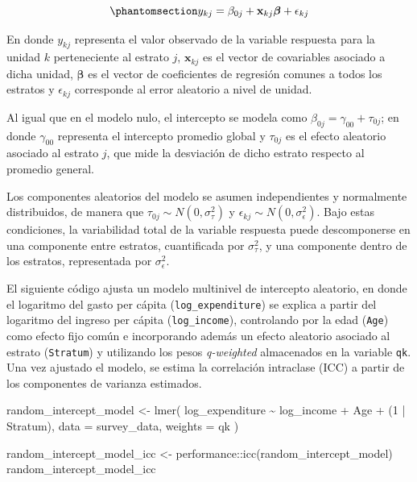 \documentclass[
  spanish,
  11pt,
  letterpaper,
  oneside,
  open=any]{scrbook}
\newenvironment{Shaded}{\begin{snugshade}}{\end{snugshade}}
\newcommand{\AttributeTok}[1]{\textcolor[rgb]{0.40,0.45,0.13}{#1}}
\newcommand{\DecValTok}[1]{\textcolor[rgb]{0.68,0.00,0.00}{#1}}
\newcommand{\FunctionTok}[1]{\textcolor[rgb]{0.28,0.35,0.67}{#1}}
\newcommand{\NormalTok}[1]{\textcolor[rgb]{0.00,0.23,0.31}{#1}}
\newcommand{\OtherTok}[1]{\textcolor[rgb]{0.00,0.23,0.31}{#1}}
\newcommand{\SpecialCharTok}[1]{\textcolor[rgb]{0.37,0.37,0.37}{#1}}
\begin{document}
\begin{equation}\protect\phantomsection\label{eq-modelo-intercepto-aleatorio}{
y_{kj} = \beta_{0j} + \mathbf{x}_{kj}\boldsymbol{\beta} + \epsilon_{kj}
}\end{equation}

En donde \(y_{kj}\) representa el valor observado de la variable
respuesta para la unidad \(k\) perteneciente al estrato \(j\),
\(\mathbf{x}_{kj}\) es el vector de covariables asociado a dicha unidad,
\(\boldsymbol{\beta}\) es el vector de coeficientes de regresión comunes
a todos los estratos y \(\epsilon_{kj}\) corresponde al error aleatorio
a nivel de unidad.

Al igual que en el modelo nulo, el intercepto se modela como
\(\beta_{0j} = \gamma_{00} + \tau_{0j}\); en donde \(\gamma_{00}\)
representa el intercepto promedio global y \(\tau_{0j}\) es el efecto
aleatorio asociado al estrato \(j\), que mide la desviación de dicho
estrato respecto al promedio general.

Los componentes aleatorios del modelo se asumen independientes y
normalmente distribuidos, de manera que
\(\tau_{0j} \sim N(0,\sigma_{\tau}^{2})\) y
\(\epsilon_{kj} \sim N(0,\sigma_{\epsilon}^{2})\). Bajo estas
condiciones, la variabilidad total de la variable respuesta puede
descomponerse en una componente entre estratos, cuantificada por
\(\sigma_{\tau}^{2}\), y una componente dentro de los estratos,
representada por \(\sigma_{\epsilon}^{2}\).

El siguiente código ajusta un modelo multinivel de intercepto aleatorio,
en donde el logaritmo del gasto per cápita (\texttt{log\_expenditure})
se explica a partir del logaritmo del ingreso per cápita
(\texttt{log\_income}), controlando por la edad (\texttt{Age}) como
efecto fijo común e incorporando además un efecto aleatorio asociado al
estrato (\texttt{Stratum}) y utilizando los pesos \emph{q-weighted}
almacenados en la variable \texttt{qk}. Una vez ajustado el modelo, se
estima la correlación intraclase (ICC) a partir de los componentes de
varianza estimados.

\begin{Shaded}
\begin{Highlighting}[]
\NormalTok{random\_intercept\_model }\OtherTok{\textless{}{-}} \FunctionTok{lmer}\NormalTok{(}
\NormalTok{  log\_expenditure }\SpecialCharTok{\textasciitilde{}}\NormalTok{ log\_income }\SpecialCharTok{+}\NormalTok{ Age }\SpecialCharTok{+}\NormalTok{ (}\DecValTok{1} \SpecialCharTok{|}\NormalTok{ Stratum),}
  \AttributeTok{data =}\NormalTok{ survey\_data,}
  \AttributeTok{weights =}\NormalTok{ qk}
\NormalTok{)}

\NormalTok{random\_intercept\_model\_icc }\OtherTok{\textless{}{-}}\NormalTok{ performance}\SpecialCharTok{::}\FunctionTok{icc}\NormalTok{(random\_intercept\_model)}
\NormalTok{random\_intercept\_model\_icc}
\end{Highlighting}
\end{Shaded}
\end{document}

